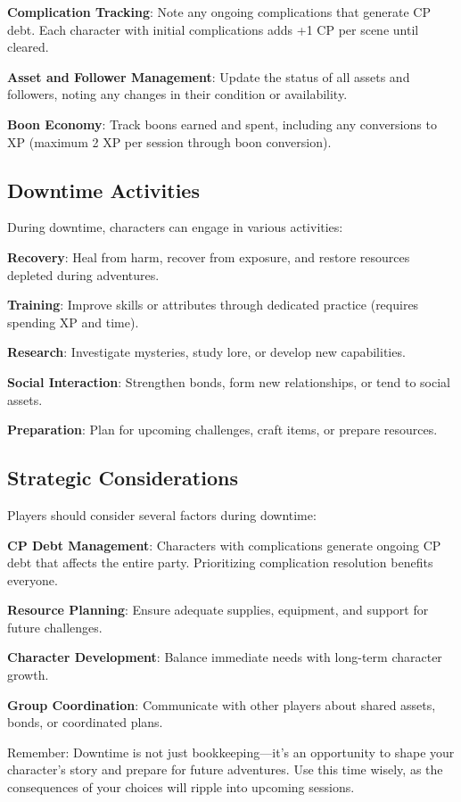\textbf{Complication Tracking}: Note any ongoing complications that generate CP debt. Each character with initial complications adds +1 CP per scene until cleared.

\textbf{Asset and Follower Management}: Update the status of all assets and followers, noting any changes in their condition or availability.

\textbf{Boon Economy}: Track boons earned and spent, including any conversions to XP (maximum 2 XP per session through boon conversion).

\subsection{Downtime Activities}

During downtime, characters can engage in various activities:

\textbf{Recovery}: Heal from harm, recover from exposure, and restore resources depleted during adventures.

\textbf{Training}: Improve skills or attributes through dedicated practice (requires spending XP and time).

\textbf{Research}: Investigate mysteries, study lore, or develop new capabilities.

\textbf{Social Interaction}: Strengthen bonds, form new relationships, or tend to social assets.

\textbf{Preparation}: Plan for upcoming challenges, craft items, or prepare resources.

\subsection{Strategic Considerations}

Players should consider several factors during downtime:

\textbf{CP Debt Management}: Characters with complications generate ongoing CP debt that affects the entire party. Prioritizing complication resolution benefits everyone.

\textbf{Resource Planning}: Ensure adequate supplies, equipment, and support for future challenges.

\textbf{Character Development}: Balance immediate needs with long-term character growth.

\textbf{Group Coordination}: Communicate with other players about shared assets, bonds, or coordinated plans.

Remember: Downtime is not just bookkeeping—it's an opportunity to shape your character's story and prepare for future adventures. Use this time wisely, as the consequences of your choices will ripple into upcoming sessions.


